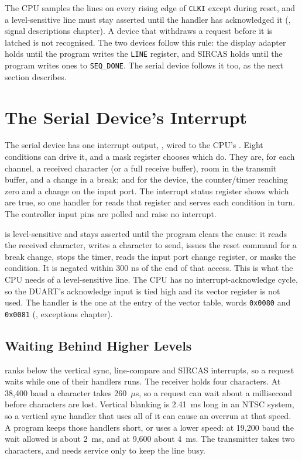 The CPU samples the lines on every rising edge of \texttt{CLKI} except during reset, and a level-sensitive line must
stay asserted until the handler has acknowledged it (\hwmanual{}, signal descriptions chapter). A device that withdraws
a request before it is latched is not recognised. The two devices follow this rule: the display adapter holds
 until the program writes the \texttt{LINE} register, and SIRCAS holds  until the
program writes ones to \texttt{SEQ\_DONE}. The serial device follows it too, as the next section describes.

\section{The Serial Device's Interrupt}
\label{sec:serial-interrupt}

The serial device has one interrupt output, , wired to the CPU's . Eight conditions can
drive it, and a mask register chooses which do. They are, for each channel, a received character (or a full receive
buffer), room in the transmit buffer, and a change in a break; and for the device, the counter/timer reaching zero and
a change on the input port. The interrupt status register shows which are true, so one handler for 
reads that register and serves each condition in turn. The controller input pins are polled and raise no interrupt.

 is level-sensitive and stays asserted until the program clears the cause: it reads the received
character, writes a character to send, issues the reset command for a break change, stops the timer, reads the input port
change register, or masks the condition. It is negated within 300 ns of the end of that access. This is what the CPU needs of a
level-sensitive line. The CPU has no interrupt-acknowledge cycle, so the DUART's acknowledge input is tied high and its
vector register is not used. The handler is the one at the  entry of the vector table, words \texttt{0x0080} and
\texttt{0x0081} (\archmanual{}, exceptions chapter).

\subsection{Waiting Behind Higher Levels}

 ranks below the vertical sync, line-compare and SIRCAS interrupts, so a request waits while one of their handlers
runs. The receiver holds four characters. At 38,400 baud a character takes 260~$\mu$s, so a request can wait about a
millisecond before characters are lost. Vertical blanking is 2.41~ms long in an NTSC system, so a vertical sync handler that
uses all of it can cause an overrun at that speed. A program keeps those handlers short, or uses a lower speed: at 19,200 baud
the wait allowed is about 2~ms, and at 9,600 about 4~ms. The transmitter takes two characters, and needs service only to keep
the line busy.

